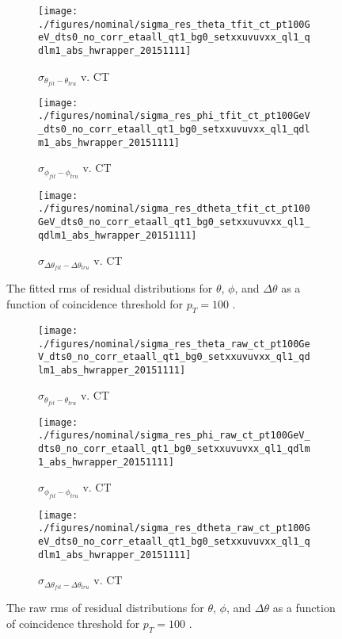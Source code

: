 \begin{figure}[!htbp]\captionsetup{justification=centering}
  \begin{center}
  \begin{subfigure}{0.3\textwidth}\caption{$\sigma_{\theta_{fit}-\theta_{tru}}$ v. CT}\texttt{[image: ./figures/nominal/sigma\_res\_theta\_tfit\_ct\_pt100GeV\_dts0\_no\_corr\_etaall\_qt1\_bg0\_setxxuvuvxx\_ql1\_qdlm1\_abs\_hwrapper\_20151111]}\end{subfigure}
  \begin{subfigure}{0.3\textwidth}\caption{$\sigma_{\phi_{fit}-\phi_{tru}}$ v. CT}\texttt{[image: ./figures/nominal/sigma\_res\_phi\_tfit\_ct\_pt100GeV\_dts0\_no\_corr\_etaall\_qt1\_bg0\_setxxuvuvxx\_ql1\_qdlm1\_abs\_hwrapper\_20151111]}\end{subfigure}
  \begin{subfigure}{0.3\textwidth}\caption{$\sigma_{\Delta\theta_{fit}-\Delta\theta_{tru}}$ v. CT}\texttt{[image: ./figures/nominal/sigma\_res\_dtheta\_tfit\_ct\_pt100GeV\_dts0\_no\_corr\_etaall\_qt1\_bg0\_setxxuvuvxx\_ql1\_qdlm1\_abs\_hwrapper\_20151111]}\end{subfigure}
  \caption{\label{fig:nomresvCTfit} The fitted rms of residual distributions for $\theta$, $\phi$, and $\Delta\theta$ as a function of coincidence threshold for $p_T=100$ \GeV.}
  \end{center}
\end{figure}

\begin{figure}[!htbp]\captionsetup{justification=centering}
  \begin{center}
  \begin{subfigure}{0.3\textwidth}\caption{$\sigma_{\theta_{fit}-\theta_{tru}}$ v. CT}\texttt{[image: ./figures/nominal/sigma\_res\_theta\_raw\_ct\_pt100GeV\_dts0\_no\_corr\_etaall\_qt1\_bg0\_setxxuvuvxx\_ql1\_qdlm1\_abs\_hwrapper\_20151111]}\end{subfigure}
  \begin{subfigure}{0.3\textwidth}\caption{$\sigma_{\phi_{fit}-\phi_{tru}}$ v. CT}\texttt{[image: ./figures/nominal/sigma\_res\_phi\_raw\_ct\_pt100GeV\_dts0\_no\_corr\_etaall\_qt1\_bg0\_setxxuvuvxx\_ql1\_qdlm1\_abs\_hwrapper\_20151111]}\end{subfigure}
  \begin{subfigure}{0.3\textwidth}\caption{$\sigma_{\Delta\theta_{fit}-\Delta\theta_{tru}}$ v. CT}\texttt{[image: ./figures/nominal/sigma\_res\_dtheta\_raw\_ct\_pt100GeV\_dts0\_no\_corr\_etaall\_qt1\_bg0\_setxxuvuvxx\_ql1\_qdlm1\_abs\_hwrapper\_20151111]}\end{subfigure}
  \caption{\label{fig:nomresvCTraw} The raw rms of residual distributions for $\theta$, $\phi$, and $\Delta\theta$ as a function of coincidence threshold for $p_T=100$ \GeV.}
  \end{center}
\end{figure}

